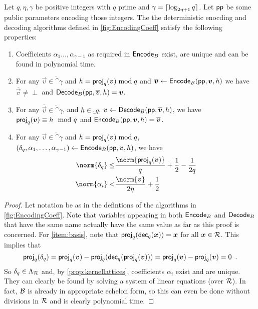 \begin{lemma}\label{lem:latencode}
Let $q,\eta,\gamma$ be positive integers with $q$ prime and $\gamma = \lceil\log_{2\eta+1}q\rceil$. Let $\mathsf{pp}$ be some public parameters encoding those integers.
The the deterministic enocding and decoding algorithms defined in \autoref{fig:EncodingCoeff} satisfy the following properties:
\begin{enumerate}
 \item Coefficients $\alpha_1\ldots,\alpha_{\gamma-1}$ as required in $\mathsf{Encode}_B$ exist, are unique and can be found in polynomial time.\label{item:basis}
 \item For any $\vec{v}\in\ring^\gamma$ and $h = \mathsf{proj}_q(\boldsymbol{v})\bmod q$ and $\overline{\boldsymbol{v}} \gets \mathsf{Encode}_B(\mathsf{pp}, \boldsymbol{v}, h)$ we have\\
 $\overline{\vec{v}}\neq \perp$ and $\mathsf{Decode}_B(\mathsf{pp}, \overline{\boldsymbol{v}}, h) = \boldsymbol{v}$.\label{item:inverse1}
 \item For any $\overline{\vec{v}}\in\ring^\gamma$, and $h\in\ring_q$, $\boldsymbol{v}\gets\mathsf{Decode}_B(\mathsf{pp}, \overline{\boldsymbol{v}}, h)$, we have\\
 $\mathsf{proj}_q(\boldsymbol{v})\equiv h \mod q$ and $\mathsf{Encode}_B(\mathsf{pp}, \boldsymbol{v}, h) = \overline{\boldsymbol{v}}$.\label{item:inverse2}
 \item For any $\vec{v}\in\ring^\gamma$ and $h=\mathsf{proj}_q(\boldsymbol{v})\bmod q$, $(\delta_q,\alpha_1,\ldots,\alpha_{\gamma-1}) \gets \mathsf{Encode}_B(\mathsf{pp},\boldsymbol{v},h)$, we have
 \begin{align*}
   \norm{\delta_q} \leq& \frac{\norm{\proj_q(\vec{v})}}{q} + \frac{1}{2} - \frac{1}{2q}\\
   \norm{\alpha_i} <& \frac{\norm{\vec{v}}}{2\eta} + \frac{1}{2} 
 \end{align*}\label{item:latencodebounds}
\end{enumerate}
\begin{proof}
Let notation be as in the defintions of the algorithms in \autoref{fig:EncodingCoeff}.
Note that variables appearing in both $\mathsf{Encode}_B$ and $\mathsf{Decode}_B$ that have the same name actually have the same value as far as this proof is concerned.
For \autoref{item:basis}, note that $\mathsf{proj}_q(\mathsf{dec}_q(\boldsymbol{x})) = \boldsymbol{x}$ for all $\boldsymbol{x}\in\mathcal{R}$. This implies that
\[
 \mathsf{proj}_q(\delta_q) = \mathsf{proj}_q(\boldsymbol{v}) - \mathsf{proj}_q(\mathsf{dec}_q(\mathsf{proj}_q(\boldsymbol{v}))) = \mathsf{proj}_q(\boldsymbol{v}) - \mathsf{proj}_q(\boldsymbol{v}) = 0\enspace.
\]
So $\delta_q\in\Lambda_{\mathcal{R}}$ and, by \autoref{prop:kernellattices}, coefficients $\alpha_i$ exist and are unique. They can clearly be found by solving a system of linear equations (over $\mathcal{R}$). In fact, $\mathcal{B}$ is already in appropriate echelon form, so this can even be done without divisions in $\mathcal{R}$ and is clearly polynomial time.


\end{proof}
\end{lemma}
